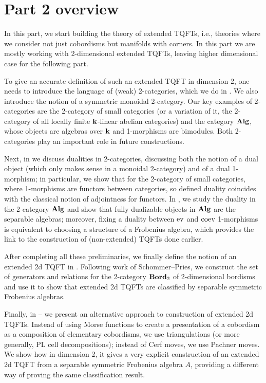 \chapter*{Part 2 overview}\label{c:p2-overview}
In this part, we start building the theory of extended TQFTs, i.e., theories
where we consider not just cobordisms but manifolds with corners. In this part
we are mostly working with 2-dimensional extended TQFTs, leaving higher
dimensional case for the following part.

To give an accurate definition of such an extended TQFT in dimension 2, one
needs to introduce the language of (weak) 2-categories, which we do in
. We also introduce the notion of a symmetric monoidal
2-category. Our key examples of 2-categories are the 2-category of small
categories (or a variation of it, the 2-category of all locally finite
$\mathbf{k}$-linear abelian categories) and the category $\mathbf{Alg}$, whose objects are
algebras over $\mathbf{k}$ and 1-morphisms are bimodules. Both 2-categories play an
important role in future constructions.

Next, in  we discuss dualities in 2-categories, discussing
both the notion of a dual object (which only makes sense in a monoidal
2-category) and of a dual 1-morphism; in particular, we show that for the
2-category of small categories, where 1-morphisms are functors between
categories, so defined duality coincides with the classical notion of
adjointness for functors.
In , we study the duality in the 2-category $\mathbf{Alg}$
and show that fully dualizable objects in $\mathbf{Alg}$ are the separable algebras;
moreover, fixing a duality between $\operatorname{ev}$ and $\operatorname{coev}$ 1-morphisms is equivalent
to choosing a structure of a Frobenius algebra, which provides the link to the
construction of (non-extended) TQFTs done earlier.


After completing all these preliminaries, we finally define the notion of an
extended 2d TQFT in . Following work of Schommer--Pries, we
construct the set of generators and relations for the 2-category $\mathbf{Bord}_2$ of
2-dimensional bordisms and use it to show that extended 2d TQFTs are classified
by separable symmetric Frobenius algebras.

Finally, in -- we present an alternative
approach to construction of extended 2d TQFTs. Instead of using Morse functions
to create a presentation of a cobordism as a composition of elementary
cobordisms, we use triangulations (or more generally, PL cell decompositions);
instead of Cerf moves, we use Pachner moves. We show how in dimension 2, it
gives a very explicit construction of an extended 2d TQFT from a separable
symmetric Frobenius algebra $A$, providing a different way of proving the same
classification result.